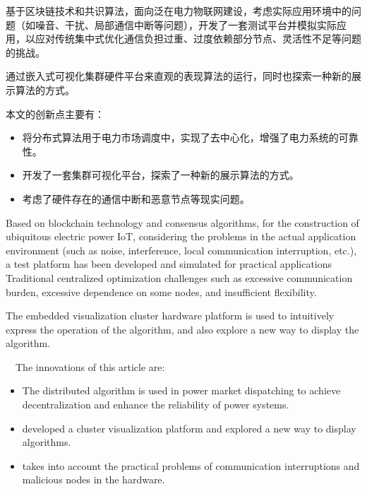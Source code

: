 \begin{cabstract}
  基于区块链技术和共识算法，面向泛在电力物联网建设，考虑实际应用环境中的问题（如噪音、干扰、局部通信中断等问题），开发了一套测试平台并模拟实际应用，以应对传统集中式优化通信负担过重、过度依赖部分节点、灵活性不足等问题的挑战。

  通过嵌入式可视化集群硬件平台来直观的表现算法的运行，同时也探索一种新的展示算法的方式。

  本文的创新点主要有：

  \begin{itemize}
    \item 将分布式算法用于电力市场调度中，实现了去中心化，增强了电力系统的可靠性。
    \item 开发了一套集群可视化平台，探索了一种新的展示算法的方式。
    \item 考虑了硬件存在的通信中断和恶意节点等现实问题。
  \end{itemize}

\end{cabstract}


\begin{eabstract}
  Based on blockchain technology and consensus algorithms, for the construction of ubiquitous electric power IoT, considering the problems in the actual application environment (such as noise, interference, local communication interruption, etc.), a test platform has been developed and simulated for practical applications Traditional centralized optimization challenges such as excessive communication burden, excessive dependence on some nodes, and insufficient flexibility.

  The embedded visualization cluster hardware platform is used to intuitively express the operation of the algorithm, and also explore a new way to display the algorithm.
  
  The innovations of this article are:

  \begin{itemize}
    \item The distributed algorithm is used in power market dispatching to achieve decentralization and enhance the reliability of power systems.
    \item developed a cluster visualization platform and explored a new way to display algorithms.
    \item takes into account the practical problems of communication interruptions and malicious nodes in the hardware.
  \end{itemize}

\end{eabstract}

